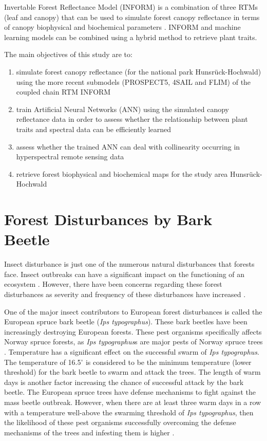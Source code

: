 \documentclass[a4paper, twoside]{templates/ociamthesis}
\providecommand{\tightlist}{%
  \setlength{\itemsep}{0pt}\setlength{\parskip}{0pt}}
\begin{document}
Invertable Forest Reflectance Model (INFORM) is a combination of three RTMs (leaf and canopy) that can be used to simulate forest canopy reflectance in terms of canopy biophysical and biochemical parameters \citep{atzberger2000development, schlerf2006inversion}. INFORM and machine learning models can be combined using a hybrid method to retrieve plant traits.

The main objectives of this study are to:

\begin{enumerate}
\def\labelenumi{\arabic{enumi}.}
\tightlist
\item
  simulate forest canopy reflectance (for the national park Hunsrück-Hochwald) using the more recent submodels (PROSPECT5, 4SAIL and FLIM) of the coupled chain RTM INFORM
\item
  train Artificial Neural Networks (ANN) using the simulated canopy reflectance data in order to assess whether the relationship between plant traits and spectral data can be efficiently learned
\item
  assess whether the trained ANN can deal with collinearity occurring in hyperspectral remote sensing data
\item
  retrieve forest biophysical and biochemical maps for the study area Hunsrück-Hochwald
\end{enumerate}

\hypertarget{forest-disturbances-by-bark-beetle}{%
\section{Forest Disturbances by Bark Beetle}\label{forest-disturbances-by-bark-beetle}}

Insect disturbance is just one of the numerous natural disturbances that forests face. Insect outbreaks can have a significant impact on the functioning of an ecosystem \citep{raffa2009literal}. However, there have been concerns regarding these forest disturbances as severity and frequency of these disturbances have increased \citep{millar2015temperate}.

One of the major insect contributors to European forest disturbances is called the European spruce bark beetle (\emph{Ips typographus}). These bark beetles have been increasingly destroying European forests. These pest organisms specifically affects Norway spruce forests, as \emph{Ips typographus}s are major pests of Norway spruce trees \citep{ohrn2014seasonal}. Temperature has a significant effect on the successful swarm of \emph{Ips typographus}. The temperature of 16.5\(^\circ\) is considered to be the minimum temperature (lower threshold) for the bark beetle to swarm and attack the trees. The length of warm days is another factor increasing the chance of successful attack by the bark beetle. The European spruce trees have defense mechanisms to fight against the mass beetle outbreak. However, when there are at least three warm days in a row with a temperature well-above the swarming threshold of \emph{Ips typographus}, then the likelihood of these pest organisms successfully overcoming the defense mechanisms of the trees and infesting them is higher \citep{wermelinger2004ecology}.
\end{document}
